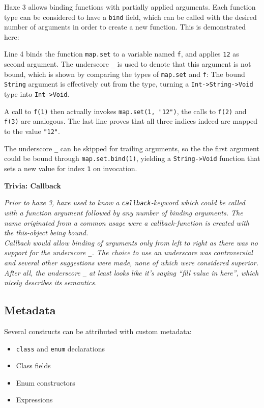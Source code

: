 \documentclass{article}
\newcommand{\type}[1]{\texttt{#1}}
\newcommand{\expr}[1]{\texttt{#1}}
\newenvironment{myshaded}
  {\def\FrameCommand{\fboxsep=\topsep\colorbox{bgcolor}}%
  \MakeFramed {\advance\hsize-\width \FrameRestore}}%
 {\endMakeFramed}
\newcommand{\trivia}[2]
	{\begin{myshaded}\noindent\textbf{Trivia: #1}\par\nobreak\noindent\ignorespaces\textit{#2}\end{myshaded}}
\newcommand{\haxe}[2][]{%
}
\begin{document}
Haxe 3 allows binding functions with partially applied arguments. Each function type can be considered to have a \expr{bind} field, which can be called with the desired number of arguments in order to create a new function. This is demonstrated here:

\haxe{assets/Bind.hx}
Line 4 binds the function \expr{map.set} to a variable named \expr{f}, and applies \expr{12} as second argument. The underscore \expr{_} is used to denote that this argument is not bound, which is shown by comparing the types of \expr{map.set} and \expr{f}: The bound \type{String} argument is effectively cut from the type, turning a \expr{Int->String->Void} type into \expr{Int->Void}.

A call to \expr{f(1)} then actually invokes \expr{map.set(1, "12")}, the calls to \expr{f(2)} and \expr{f(3)} are analogous. The last line proves that all three indices indeed are mapped to the value \expr{"12"}.

The underscore \expr{_} can be skipped for trailing arguments, so the the first argument could be bound through \expr{map.set.bind(1)}, yielding a \expr{String->Void} function that sets a new value for index \expr{1} on invocation.

\trivia{Callback}{Prior to haxe 3, haxe used to know a \expr{callback}-keyword which could be called with a function argument followed by any number of binding arguments. The name originated from a common usage were a callback-function is created with the this-object being bound.\\
Callback would allow binding of arguments only from left to right as there was no support for the underscore \expr{_}. The choice to use an underscore was controversial and several other suggestions were made, none of which were considered superior. After all, the underscore \expr{_} at least looks like it's saying ``fill value in here'', which nicely describes its semantics.}



\subsection{Metadata}
\label{Metadata}

Several constructs can be attributed with custom metadata:

\begin{itemize}
	\item \expr{class} and \expr{enum} declarations
	\item Class fields
	\item Enum constructors
	\item Expressions
\end{itemize}
\end{document}
